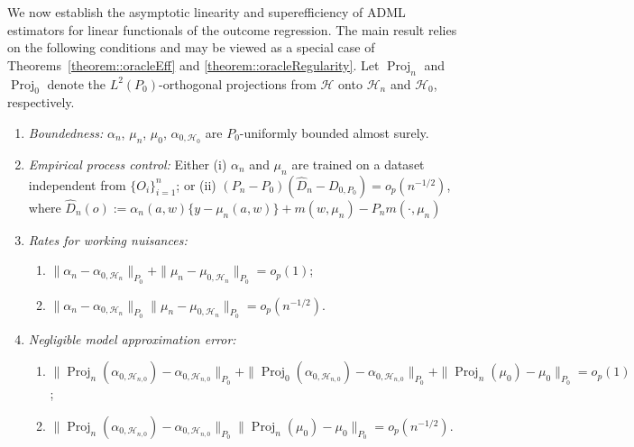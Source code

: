 \documentclass[11pt]{article}
\theoremstyle{definition}
\begin{document}
We now establish the asymptotic linearity and superefficiency of ADML estimators for linear functionals of the outcome regression. The main result relies on the following conditions and may be viewed as a special case of Theorems~\ref{theorem::oracleEff} and \ref{theorem::oracleRegularity}. Let \(\operatorname{Proj}_n\) and \(\operatorname{Proj}_0\) denote the \(L^2(P_0)\)-orthogonal projections from \(\mathcal{H}\) onto \(\mathcal{H}_n\) and \(\mathcal{H}_0\), respectively.


 


\begin{enumerate}[label=(B\arabic*), ref=B\arabic*,resume=condlinear]
     \item \textit{Boundedness:} $\alpha_n$, $\mu_n$, $\mu_0$, $\alpha_{0,\mathcal{H}_{0}}$ are $P_0$-uniformly bounded almost surely. \label{cond::bounded}
    \item \textit{Empirical process control:} \label{cond::linearsamplesplit} Either (i) $\alpha_n$ and $\mu_n$ are trained on a dataset independent from  $\{O_i\}_{i=1}^n$; or (ii) $ (P_n - P_0) (\widehat{D}_n - D_{0, P_0}) = o_p(n^{-1/2})$, where $\widehat{D}_n(o) := \alpha_n(a,w)\{y - \mu_n(a,w)\} + m(w, \mu_n) -  P_n m(\cdot, \mu_n)$ 
    \item \textit{Rates for working nuisances:}  \label{cond::linearnuisancerate}
    \begin{enumerate}
        \item[(i)] $\|\alpha_n - \alpha_{0, \mathcal{H}_n}\|_{P_0} + \|\mu_n - \mu_{0, \mathcal{H}_n}\|_{P_0} = o_p(1)$;
        \item[(ii)] $\|\alpha_n - \alpha_{0, \mathcal{H}_n}\|_{P_0}\|\mu_n - \mu_{0, \mathcal{H}_n}\|_{P_0} = o_p(n^{-1/2})$.
    \end{enumerate} 
    \item \textit{Negligible model approximation error:} \label{cond::oraclebiaslinear}
    \begin{enumerate}
        \item[(i)] $\|\operatorname{Proj}_n (\alpha_{0,\mathcal{H}_{n,0}})  - \alpha_{0,\mathcal{H}_{n,0}}\|_{P_0} + \|\operatorname{Proj}_0 (\alpha_{0,\mathcal{H}_{n,0}})  - \alpha_{0,\mathcal{H}_{n,0}}\|_{P_0} +\|  \operatorname{Proj}_n(\mu_0) - \mu_0 \|_{P_0}  = o_p(1)$;
        \item[(ii)] $\|\operatorname{Proj}_n (\alpha_{0,\mathcal{H}_{n,0}})  - \alpha_{0,\mathcal{H}_{n,0}}\|_{P_0} \|  \operatorname{Proj}_n(\mu_0) - \mu_0 \|_{P_0} = o_p(n^{-1/2})$.  
    \end{enumerate} 
\end{enumerate}
\end{document}
